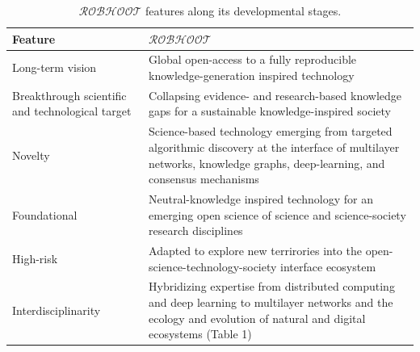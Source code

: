 \documentclass[12pt, a4paper]{article} %
\begin{document}
\begin{table}[ht]
\begin{tabular}{ p{3.5cm} | p{14cm}}
  \hline \hline
  \textbf{Feature} &\textbf{$\mathcal{ROBHOOT}$}\\  \hline
  Long-term vision & Global open-access to a fully reproducible knowledge-generation inspired technology \\ \hline
  Breakthrough scientific and technological target & Collapsing evidence- and research-based knowledge gaps for a sustainable knowledge-inspired society\\ \hline
  Novelty & Science-based technology emerging from targeted algorithmic discovery at the interface of multilayer networks, knowledge graphs, deep-learning, and consensus mechanisms\\ \hline
  Foundational & Neutral-knowledge inspired technology for an emerging open science of science and science-society research disciplines \\ \hline
  High-risk & Adapted to explore new terrirories into the open-science-technology-society interface ecosystem \\ \hline
  Interdisciplinarity & Hybridizing expertise from distributed computing and deep learning to multilayer networks and the ecology and evolution of natural and digital ecosystems (Table 1) \\ \hline
  \bottomrule

\end{tabular}
\caption{{\bf $\mathcal{ROBHOOT}$} features along its developmental stages.}
\end{table}
 
\end{document}
